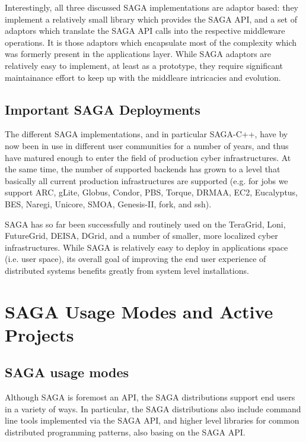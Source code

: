 \documentclass[12pt]{article}
\begin{document}
  Interestingly, all three discussed SAGA implementations are adaptor
  based: they implement a relatively small library which provides the
  SAGA API, and a set of adaptors which translate the SAGA API calls
  into the respective middleware operations.  It is those adaptors
  which encapsulate most of the complexity which was formerly present
  in the applications layer.  While SAGA adaptors are relatively easy
  to implement, at least as a prototype, they require significant
  maintainance effort to keep up with the middleare intricacies and
  evolution.


 \subsection{Important SAGA Deployments}

  The different SAGA implementations, and in particular SAGA-C++, have
  by now been in use in different user communities for a number of
  years, and thus have matured enough to enter the  field of
  production cyber infrastructures.  At the same time, the number of
  supported backends has grown to a level that basically all current
  production infrastructures are supported (e.g. for jobs we support
  ARC, gLite, Globus, Condor, PBS, Torque, DRMAA, EC2, Eucalyptus,
  BES,  Naregi, Unicore, SMOA, Genesis-II, fork, and ssh).  

  SAGA has so far been successfully and routinely used on the
  TeraGrid, Loni, FutureGrid, DEISA, DGrid, and a number of smaller,
  more localized cyber infrastructures.  While SAGA is relatively easy
  to deploy in applications space (i.e. user space), its overall goal
  of improving the end user experience of distributed systems benefits
  greatly from system level installations.



\section{SAGA Usage Modes and Active Projects}

\subsection{SAGA usage modes}

  Although SAGA is foremost an API, the SAGA distributions support end
  users in a variety of ways.  In particular, the SAGA distributions
  also include command line tools implemented via the SAGA API, and
  higher level libraries for common distributed programming patterns,
  also basing on the SAGA API. 
\end{document}
